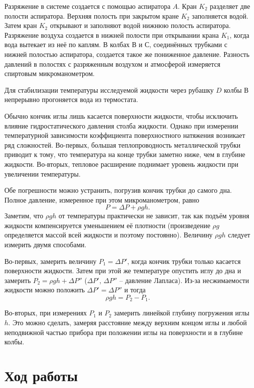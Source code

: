 \documentclass[a4paper,12pt]{article} %
\begin{document}
Разряжение в системе создается с помощью аспиратора $ A $. Кран $ K_2 $ разделяет две полости аспиратора. Верхняя полость при закрытом кране $ K_2 $ заполняется водой. Затем кран $ K_2 $ открывают и заполняют водой  нижнюю полость  аспиратора.  Разряжение воздуха создается в нижней полости  при открывании крана $ K_1 $, когда  вода вытекает из неё по каплям. В колбах $ В $ и $ С $, соединённых трубками с нижней полостью аспиратора, создается такое же пониженное давление. Разность давлений в полостях с разряженным воздухом и атмосферой измеряется спиртовым микроманометром. 

Для стабилизации температуры исследуемой жидкости через рубашку $ D $ колбы $ В $ непрерывно прогоняется вода из термостата.

Обычно кончик иглы лишь касается поверхности жидкости, чтобы исключить влияние гидростатического давления столба жидкости. Однако при измерении температурной зависимости коэффициента поверхностного натяжения возникает ряд сложностей. Во-первых, большая теплопроводность металлической трубки приводит к тому, что температура на конце трубки заметно ниже, чем в глубине жидкости. Во-вторых, тепловое расширение поднимает уровень жидкости при увеличении температуры.

Обе погрешности можно устранить, погрузив кончик трубки до самого дна. Полное давление, измеренное при этом микроманометром, равно \[ P = \Delta P + \rho g h.\] Заметим, что $ \rho gh $ от температуры практически не зависит, так как подъём уровня жидкости компенсируется уменьшением её плотности (произведение $ \rho g $ определяется массой всей жидкости и поэтому постоянно). Величину  $ \rho g h $ следует измерить двумя способами.

Во-первых, замерить величину $ P_1= \Delta P' $, когда кончик трубки только касается поверхности жидкости. Затем при этой же температуре опустить иглу до дна и замерить $ P_2= \rho gh + \Delta P'' $ ($ \Delta P' $, $ \Delta P'' $ -- давление Лапласа). Из-за  несжимаемости  жидкости можно положить $ \Delta P' = \Delta P'' $ и тогда \[ \rho gh= P_2 - P_1. \]
 
Во-вторых, при измерениях $ P_1 $ и $ P_2 $ замерить линейкой  глубину погружения иглы $ h $. Это можно сделать, замеряя расстояние между верхним концом иглы и любой неподвижной частью прибора при положении иглы на поверхности и в глубине колбы.
\newpage
\section{Ход работы}
\end{document}
